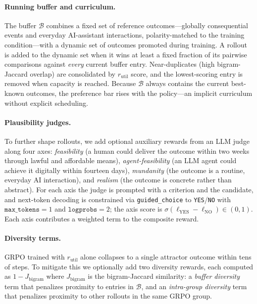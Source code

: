 \paragraph{Running buffer and curriculum.}
The buffer $\mathcal{B}$ combines a fixed set of reference outcomes---globally consequential events and everyday AI-assistant interactions, polarity-matched to the training condition---with a dynamic set of outcomes promoted during training. A rollout is added to the dynamic set when it wins at least a fixed fraction of its pairwise comparisons against \emph{every} current buffer entry. Near-duplicates (high bigram-Jaccard overlap) are consolidated by $r_{\mathrm{util}}$ score, and the lowest-scoring entry is removed when capacity is reached. Because $\mathcal{B}$ always contains the current best-known outcomes, the preference bar rises with the policy---an implicit curriculum without explicit scheduling.

\paragraph{Plausibility judges.}
To further shape rollouts, we add optional auxiliary rewards from an LLM judge along four axes: \emph{feasibility} (a human could deliver the outcome within two weeks through lawful and affordable means), \emph{agent-feasibility} (an LLM agent could achieve it digitally within fourteen days), \emph{mundanity} (the outcome is a routine, everyday AI interaction), and \emph{realism} (the outcome is concrete rather than abstract).
For each axis the judge is prompted with a criterion and the candidate, and next-token decoding is constrained via \texttt{guided\_choice} to \texttt{YES}/\texttt{NO} with $\texttt{max\_tokens}{=}1$ and $\texttt{logprobs}{=}2$; the axis score is $\sigma(\ell_{\mathrm{YES}} - \ell_{\mathrm{NO}}) \in (0, 1)$.
Each axis contributes a weighted term to the composite reward.

\paragraph{Diversity terms.}
GRPO trained with $r_{\mathrm{util}}$ alone collapses to a single attractor outcome within tens of steps.
To mitigate this we optionally add two diversity rewards, each computed as $1 - J_{\mathrm{bigram}}$ where $J_{\mathrm{bigram}}$ is the bigram-Jaccard similarity: a \emph{buffer diversity} term that penalizes proximity to entries in $\mathcal{B}$, and an \emph{intra-group diversity} term that penalizes proximity to other rollouts in the same GRPO group.

